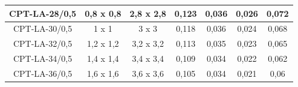 \begin{table}[H]
\begin{tabular}{|c|c|c|c|c|c|c|}
CPT-LA-28/0,5                                                                 & 0,8 x 0,8                                                                                          & 2,8 x 2,8                                                                            & 0,123                                                                      & 0,036                                                                           & 0,026                                                                             & 0,072                                                                             \\ \hline
CPT-LA-30/0,5                                                                 & 1 x 1                                                                                              & 3 x 3                                                                                & 0,118                                                                      & 0,036                                                                           & 0,024                                                                             & 0,068                                                                             \\ \hline
CPT-LA-32/0,5                                                                 & 1,2 x 1,2                                                                                          & 3,2 x 3,2                                                                            & 0,113                                                                      & 0,035                                                                           & 0,023                                                                             & 0,065                                                                             \\ \hline
CPT-LA-34/0,5                                                                 & 1,4 x 1,4                                                                                          & 3,4 x 3,4                                                                            & 0,109                                                                      & 0,034                                                                           & 0,022                                                                             & 0,062                                                                             \\ \hline
CPT-LA-36/0,5                                                                 & 1,6 x 1,6                                                                                          & 3,6 x 3,6                                                                            & 0,105                                                                      & 0,034                                                                           & 0,021                                                                             & 0,06                                                                              \\ \hline

\end{tabular}
\end{table}
